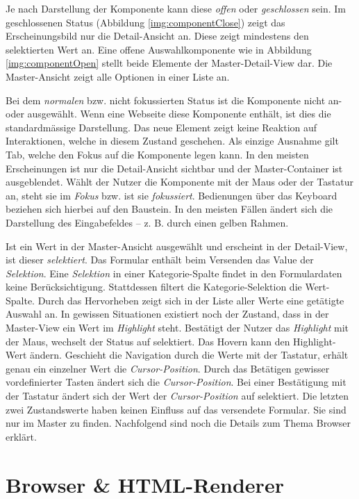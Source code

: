 Je nach Darstellung der Komponente kann diese \emph{offen} oder \emph{geschlossen} sein. 
Im geschlossenen Status (Abbildung \ref{img:componentClose}) zeigt das Erscheinungsbild nur die Detail-Ansicht an.
Diese zeigt mindestens den selektierten Wert an. 
Eine offene Auswahlkomponente wie in Abbildung \ref{img:componentOpen} stellt beide Elemente der Master-Detail-View dar. 
Die Master-Ansicht zeigt alle Optionen in einer Liste an. 

Bei dem \emph{normalen} bzw. nicht fokussierten Status ist die Komponente nicht an- oder ausgewählt. 
Wenn eine Webseite diese Komponente enthält, ist dies die standardmässige Darstellung. 
Das neue Element zeigt keine Reaktion auf Interaktionen, welche in diesem Zustand geschehen. 
Als einzige Ausnahme gilt Tab, welche den Fokus auf die Komponente legen kann. 
In den meisten Erscheinungen ist nur die Detail-Ansicht sichtbar und der Master-Container ist ausgeblendet. 
Wählt der Nutzer die Komponente mit der Maus oder der Tastatur an, steht sie im \emph{Fokus} bzw. ist sie \emph{fokussiert}. 
Bedienungen über das Keyboard beziehen sich hierbei auf den Baustein. 
In den meisten Fällen ändert sich die Darstellung des Eingabefeldes – z. B. durch einen gelben Rahmen. 

Ist ein Wert in der Master-Ansicht ausgewählt und erscheint in der Detail-View, ist dieser \emph{selektiert}. 
Das Formular enthält beim Versenden das Value der \emph{Selektion}. 
Eine \emph{Selektion} in einer Kategorie-Spalte findet in den Formulardaten keine Berücksichtigung. 
Stattdessen filtert die Kategorie-Selektion die Wert-Spalte. 
Durch das Hervorheben zeigt sich in der Liste aller Werte eine getätigte Auswahl an. 
In gewissen Situationen existiert noch der Zustand, dass in der Master-View ein Wert im \emph{Highlight} steht. 
Bestätigt der Nutzer das \emph{Highlight} mit der Maus, wechselt der Status auf selektiert. 
Das Hovern kann den Highlight-Wert ändern. 
Geschieht die Navigation durch die Werte mit der Tastatur, erhält genau ein einzelner Wert die \emph{Cursor-Position}. 
Durch das Betätigen gewisser vordefinierter Tasten ändert sich die \emph{Cursor-Position}. 
Bei einer Bestätigung mit der Tastatur ändert sich der Wert der \emph{Cursor-Position} auf selektiert. 
Die letzten zwei Zustandswerte haben keinen Einfluss auf das versendete Formular. 
Sie sind nur im Master zu finden. 
Nachfolgend sind noch die Details zum Thema Browser erklärt. 


\section{Browser \& HTML-Renderer}
\label{sec:browserRenderer}


